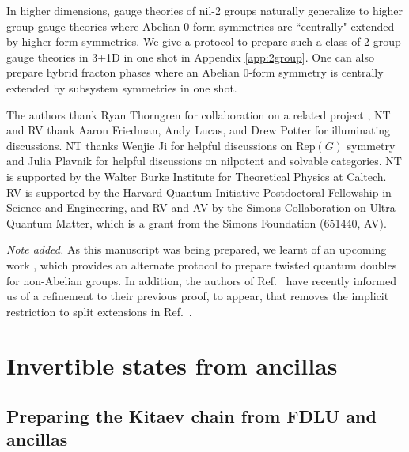 \documentclass[nofootinbib,prx,twocolumn,showpacs,superscriptaddress,notitlepage,amsmath,amssymb]{revtex4-2}
\makeatletter
\theoremstyle{definition}
\def\Rep{\text{Rep}}
\renewcommand\onecolumngrid{%
\do@columngrid{one}{\@ne}%
\def\set@footnotewidth{\onecolumngrid}%
\def\footnoterule{\kern-6pt\hrule width 1.5in\kern6pt}%
}
\makeatother
\begin{document}
In higher dimensions, gauge theories of nil-2 groups naturally generalize to higher group gauge theories \cite{KapustinThorngren2017} where Abelian $0$-form symmetries are ``centrally" extended by higher-form symmetries. We give a protocol to prepare such a class of 2-group gauge theories in 3+1D in one shot in Appendix \ref{app:2group}. One can also prepare hybrid fracton phases\cite{TJV1,TJV2} where an Abelian 0-form symmetry is centrally extended by subsystem symmetries in one shot.





\begin{acknowledgments}

The authors thank Ryan Thorngren for collaboration on a related project \cite{measureSPT}, NT and RV thank Aaron Friedman, Andy Lucas, and Drew Potter for illuminating discussions. NT thanks Wenjie Ji for helpful discussions on $\Rep(G)$ symmetry and Julia Plavnik for helpful discussions on nilpotent and solvable categories. NT is supported by the Walter Burke Institute for Theoretical Physics at Caltech. RV is supported by the Harvard Quantum Initiative Postdoctoral Fellowship in Science and Engineering, and RV and AV by the Simons Collaboration on Ultra-Quantum Matter, which is a grant from the Simons Foundation (651440, AV).
\end{acknowledgments}

\vspace{5pt}

\emph{Note added.} As this manuscript was being prepared, we learnt of an upcoming work \cite{Li22}, which provides an alternate protocol to prepare twisted quantum doubles for non-Abelian groups. In addition, the authors of Ref.~ have recently informed us of a refinement to their previous proof, to appear, that removes the implicit restriction to split extensions in Ref.~.


\vspace{5pt}


\onecolumngrid
\newpage
\appendix


\newpage

\section{Invertible states from ancillas}


\subsection{Preparing the Kitaev chain from FDLU and ancillas}\label{app:Kitaev}
\end{document}
